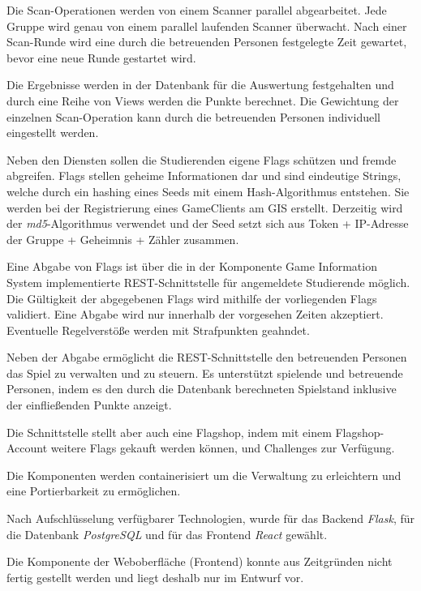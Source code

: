 Die Scan-Operationen werden von einem Scanner parallel abgearbeitet. Jede Gruppe wird genau von einem parallel laufenden Scanner überwacht. Nach einer Scan-Runde wird eine durch die betreuenden Personen festgelegte Zeit gewartet, bevor eine neue Runde gestartet wird.

Die Ergebnisse werden in der Datenbank für die Auswertung festgehalten und durch eine Reihe von Views werden die Punkte berechnet. Die Gewichtung der einzelnen Scan-Operation kann durch die betreuenden Personen individuell eingestellt werden.

Neben den Diensten sollen die Studierenden eigene Flags schützen und fremde abgreifen.
Flags stellen geheime Informationen dar und sind eindeutige Strings, welche durch ein hashing eines Seeds mit einem Hash-Algorithmus entstehen. Sie werden bei der Registrierung eines GameClients am GIS erstellt.
Derzeitig wird der \textit{md5}-Algorithmus verwendet und der Seed setzt sich aus Token + IP-Adresse der Gruppe + Geheimnis + Zähler zusammen.

Eine Abgabe von Flags ist über die in der Komponente Game Information System implementierte REST-Schnittstelle für angemeldete Studierende möglich. Die Gültigkeit der abgegebenen Flags wird mithilfe der vorliegenden Flags validiert. Eine Abgabe wird nur innerhalb der vorgesehen Zeiten akzeptiert. Eventuelle Regelverstöße werden mit Strafpunkten geahndet.

Neben der Abgabe ermöglicht die REST-Schnittstelle den betreuenden Personen das Spiel zu verwalten und zu steuern. Es unterstützt spielende und betreuende Personen, indem es den durch die Datenbank berechneten Spielstand inklusive der einfließenden Punkte anzeigt.

Die Schnittstelle stellt aber auch eine Flagshop, indem mit einem Flagshop-Account weitere Flags gekauft werden können, und Challenges zur Verfügung.

Die Komponenten werden containerisiert um die Verwaltung zu erleichtern und eine Portierbarkeit zu ermöglichen.

Nach Aufschlüsselung verfügbarer Technologien, wurde für das Backend \textit{Flask}, für die Datenbank \textit{PostgreSQL} und für das Frontend \textit{React} gewählt.

Die Komponente der Weboberfläche (Frontend) konnte aus Zeitgründen nicht fertig gestellt werden und liegt deshalb nur im Entwurf vor.




